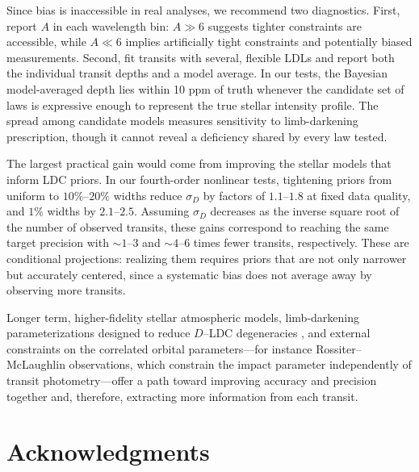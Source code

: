 \documentclass[twocolumn]{aastex631}
\newcommand{\vtwo}[1]{{#1}}
\begin{document}
\vtwo{Since bias is inaccessible in real analyses, we recommend two diagnostics.} First, report $A$ in each wavelength bin: $A\gg6$ suggests tighter constraints are accessible, while $A\ll6$ implies artificially tight constraints and potentially biased measurements. \vtwo{Second, fit transits with several, flexible LDLs and report both the individual transit depths and a model average. In our tests, the Bayesian model-averaged depth lies within 10 ppm of truth whenever the candidate set of laws is expressive enough to represent the true stellar intensity profile. The spread among candidate models measures sensitivity to limb-darkening prescription, though it cannot reveal a deficiency shared by every law tested.}

\vtwo{The largest practical gain would come from improving the stellar models that inform LDC priors. In our fourth-order nonlinear tests, tightening priors from uniform to $10\%$--$20\%$ widths reduce $\sigma_D$ by factors of $1.1$--$1.8$ at fixed data quality, and $1\%$ widths by $2.1$--$2.5$. Assuming $\sigma_D$ decreases as the inverse square root of the number of observed transits, these gains correspond to reaching the same target precision with ${\sim}1$--$3$ and ${\sim}4$--$6$ times fewer transits, respectively. These are conditional projections: realizing them requires priors that are not only narrower but accurately centered, since a systematic bias does not average away by observing more transits.}

\vtwo{Longer term, higher-fidelity stellar atmospheric models, limb-darkening parameterizations designed to reduce $D$--LDC degeneracies \citep[e.g., more orthogonal bases, as in][]{Maxted2018,Maxted2023}, and external constraints on the correlated orbital parameters---for instance Rossiter--McLaughlin observations, which constrain the impact parameter independently of transit photometry---offer a path toward improving accuracy and precision together and, therefore, extracting more information from each transit.}

\section*{Acknowledgments}
\end{document}
